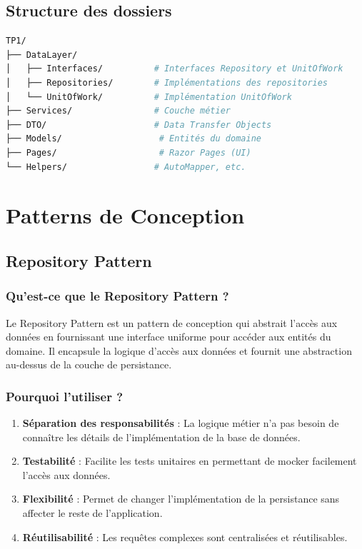 \documentclass[12pt,a4paper]{article}
\begin{document}
\subsection{Structure des dossiers}

\begin{lstlisting}[language=bash, caption=Structure du projet, float=h!]
TP1/
├── DataLayer/
│   ├── Interfaces/          # Interfaces Repository et UnitOfWork
│   ├── Repositories/        # Implémentations des repositories
│   └── UnitOfWork/          # Implémentation UnitOfWork
├── Services/                # Couche métier
├── DTO/                     # Data Transfer Objects
├── Models/                   # Entités du domaine
├── Pages/                    # Razor Pages (UI)
└── Helpers/                 # AutoMapper, etc.
\end{lstlisting}

\section{Patterns de Conception}

\subsection{Repository Pattern}

\subsubsection{Qu'est-ce que le Repository Pattern ?}

Le Repository Pattern est un pattern de conception qui abstrait l'accès aux données en fournissant une interface uniforme pour accéder aux entités du domaine. Il encapsule la logique d'accès aux données et fournit une abstraction au-dessus de la couche de persistance.

\subsubsection{Pourquoi l'utiliser ?}

\begin{enumerate}
    \item \textbf{Séparation des responsabilités} : La logique métier n'a pas besoin de connaître les détails de l'implémentation de la base de données.
    \item \textbf{Testabilité} : Facilite les tests unitaires en permettant de mocker facilement l'accès aux données.
    \item \textbf{Flexibilité} : Permet de changer l'implémentation de la persistance sans affecter le reste de l'application.
    \item \textbf{Réutilisabilité} : Les requêtes complexes sont centralisées et réutilisables.
\end{enumerate}
\end{document}
